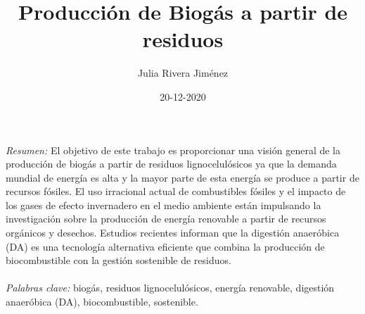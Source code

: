 \documentclass[a4paper,11pt]{article}
\begin{document}
\title{Producción de Biogás a partir de residuos}
\author{Julia Rivera Jiménez}
\date{20-12-2020}
\maketitle
{\em Resumen:} 
El objetivo de este trabajo es proporcionar una visión general de la producción de biogás a partir de residuos lignocelulósicos ya que la demanda mundial de energía es alta y la mayor parte de esta energía se produce a partir de recursos fósiles. El uso irracional actual de combustibles fósiles y el impacto de los gases de efecto invernadero en el medio ambiente están impulsando la investigación sobre la producción de energía renovable a partir de recursos orgánicos y desechos. Estudios recientes informan que la digestión anaeróbica (DA) es una tecnología alternativa eficiente que combina la producción de biocombustible con la gestión sostenible de residuos.
\\
\\
{\em Palabras clave:}
biogás, residuos lignocelulósicos, energía renovable, digestión anaeróbica (DA), biocombustible, sostenible.
\end{document}

